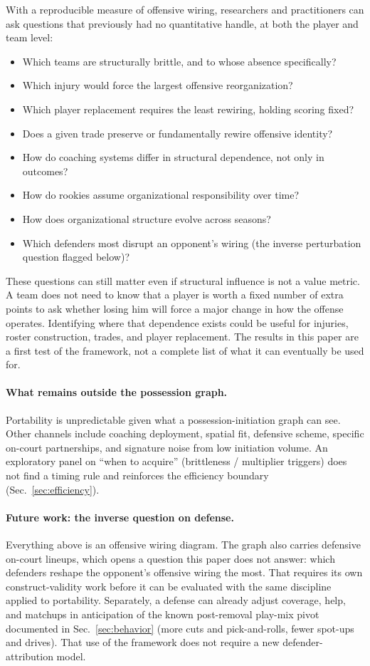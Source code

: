 \documentclass[11pt]{article}
\begin{document}
With a reproducible measure of offensive wiring, researchers and practitioners can ask
questions that previously had no quantitative handle, at both the player and team level:
\begin{itemize}[leftmargin=1.6em,itemsep=0.1em]
 \item Which teams are structurally brittle, and to whose absence specifically?
 \item Which injury would force the largest offensive reorganization?
 \item Which player replacement requires the least rewiring, holding scoring fixed?
 \item Does a given trade preserve or fundamentally rewire offensive identity?
 \item How do coaching systems differ in structural dependence, not only in outcomes?
 \item How do rookies assume organizational responsibility over time?
 \item How does organizational structure evolve across seasons?
 \item Which defenders most disrupt an opponent's wiring (the inverse perturbation
 question flagged below)?
\end{itemize}
These questions can still matter even if structural influence is not a value metric. A team
does not need to know that a player is worth a fixed number of extra points to ask whether
losing him will force a major change in how the offense operates. Identifying where that
dependence exists could be useful for injuries, roster construction, trades, and player
replacement. The results in this paper are a first test of the framework, not a complete list
of what it can eventually be used for.

\paragraph{What remains outside the possession graph.}
Portability is unpredictable given what a possession-initiation graph can see. Other channels
include coaching deployment, spatial fit, defensive scheme, specific on-court partnerships,
and signature noise from low initiation volume. An exploratory panel on ``when to acquire''
(brittleness / multiplier triggers) does not find a timing rule and reinforces the efficiency
boundary (Sec.~\ref{sec:efficiency}).

\paragraph{Future work: the inverse question on defense.}
Everything above is an offensive wiring diagram. The graph also carries defensive on-court
lineups, which opens a question this paper does not answer: which defenders reshape the
opponent's offensive wiring the most. That requires its own construct-validity work before it
can be evaluated with the same discipline applied to portability. Separately, a defense can
already adjust coverage, help, and matchups in anticipation of the known post-removal
play-mix pivot documented in Sec.~\ref{sec:behavior} (more cuts and pick-and-rolls, fewer
spot-ups and drives). That use of the framework does not require a new defender-attribution
model.
\end{document}
